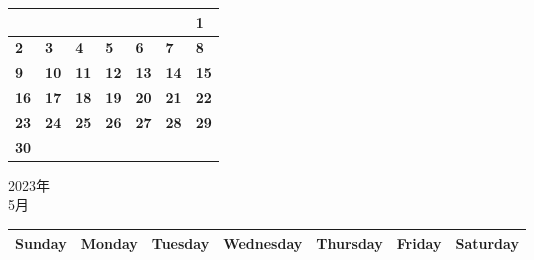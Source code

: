 \documentclass[a4paper,landscape]{jsarticle}
\newcommand{\dig}{\hspace{29mm}}
\newcommand{\tdig}{\hspace{27mm}}
\newcommand{\LBF}{\LARGE\textbf}
\begin{document}
\begingroup
\renewcommand{\arraystretch}{4}
\begin{tabular}{|p{32mm}|p{32mm}|p{32mm}|p{32mm}|p{32mm}|p{32mm}|p{32mm}|}
\hline
&&&&&&\raisebox{30pt} {\dig\LBF{1}}\\
\hline
\raisebox{30pt} {\dig\LBF{2}}&\raisebox{30pt} {\dig\LBF{3}}&\raisebox{30pt} {\dig\LBF{4}}&\raisebox{30pt} {\dig\LBF{5}}&\raisebox{30pt} {\dig\LBF{6}}&\raisebox{30pt} {\dig\LBF{7}}&\raisebox{30pt} {\dig\LBF{8}}\\
\hline
\raisebox{30pt} {\dig\LBF{9}}&\raisebox{30pt} {\tdig\LBF{10}}&\raisebox{30pt} {\tdig\LBF{11}}&\raisebox{30pt} {\tdig\LBF{12}}&\raisebox{30pt} {\tdig\LBF{13}}&\raisebox{30pt} {\tdig\LBF{14}}&\raisebox{30pt} {\tdig\LBF{15}}\\
\hline
\raisebox{30pt} {\tdig\LBF{16}}&\raisebox{30pt} {\tdig\LBF{17}}&\raisebox{30pt} {\tdig\LBF{18}}&\raisebox{30pt} {\tdig\LBF{19}}&\raisebox{30pt} {\tdig\LBF{20}}&\raisebox{30pt} {\tdig\LBF{21}}&\raisebox{30pt} {\tdig\LBF{22}}\\
\hline
\raisebox{30pt} {\tdig\LBF{23}}&\raisebox{30pt} {\tdig\LBF{24}}&\raisebox{30pt} {\tdig\LBF{25}}&\raisebox{30pt} {\tdig\LBF{26}}&\raisebox{30pt} {\tdig\LBF{27}}&\raisebox{30pt} {\tdig\LBF{28}}&\raisebox{30pt} {\tdig\LBF{29}}\\
\hline
\raisebox{30pt} {\tdig\LBF{30}}&&&&&&\\
\hline
\end{tabular}
\endgroup
\newpage\begin{center}
	\LARGE 2023年\\
	\LARGE 5月
\end{center}

\begingroup
\renewcommand{\arraystretch}{1.4}
\begin{tabular}{|>{\centering\arraybackslash}p{32mm}|>{\centering\arraybackslash}p{32mm}|>{\centering\arraybackslash}p{32mm}|>{\centering\arraybackslash}p{32mm}|>{\centering\arraybackslash}p{32mm}|>{\centering\arraybackslash}p{32mm}|>{\centering\arraybackslash}p{32mm}|}
\hline
\large Sunday&\large Monday &\large Tuesday&\large Wednesday&\large Thursday&\large Friday&\large Saturday\\
\hline
\end{tabular}
\endgroup
\end{document}
